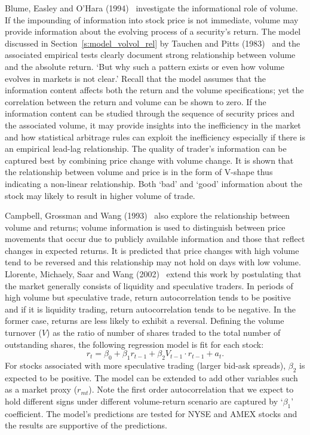 Blume, Easley and O'Hara (1994)~\cite{blumeohar} investigate the informational role of volume. If the impounding of information into stock price is not immediate, volume may provide information about the evolving process of a security's return. The model discussed in Section~\ref{s:model_volvol_rel} by Tauchen and Pitts (1983)~\cite{tauchenpitts} and the associated empirical tests clearly document strong relationship between volume and the absolute return. `But why such a pattern exists or even how volume evolves in markets is not clear.' Recall that the model assumes that the information content affects both the return and the volume specifications; yet the correlation between the return and volume can be shown to zero. If the information content can be studied through the sequence of security prices and the associated volume, it may provide insights into the inefficiency in the market and how statistical arbitrage rules can exploit the inefficiency especially if there is an empirical lead-lag relationship. The quality of trader's information can be captured best by combining price change with volume change. It is shown that the relationship between volume and price is in the form of V-shape thus indicating a non-linear relationship. Both `bad' and `good' information about the stock may likely to result in higher volume of trade. 


Campbell, Grossman and Wang (1993)~\cite{campbellgross} also explore the relationship between volume and returns; volume information is used to distinguish between price movements that occur due to publicly available information and those that reflect changes in expected returns. It is predicted that price changes with high volume tend to be reversed and this relationship may not hold on days with low volume. Llorente, Michaely, Saar and Wang (2002)~\cite{llmsw} extend this work by postulating that the market generally consists of liquidity and speculative traders. In periods of high volume but speculative trade, return autocorrelation tends to be positive and if it is liquidity trading, return autocorrelation tends to be negative. In the former case, returns are less likely to exhibit a reversal. Defining the volume turnover ($V$) as the ratio of number of shares traded to the total number of outstanding shares, the following regression model is fit for each stock:
	\begin{equation} \label{eqn:regxt}
	r_t= \beta_0 + \beta_1 r_{t-1} + \beta_2 V_{t-1} \cdot r_{t-1} + a_t.
	\end{equation}
For stocks associated with more speculative trading (larger bid-ask spreads), $\beta_2$ is expected to be positive. The model can be extended to add other variables such as a market proxy ($r_{mt}$). Note the first order autocorrelation that we expect to hold different signs under different volume-return scenario are captured by `$\beta_1$' coefficient. The model's predictions are tested for NYSE and AMEX stocks and the results are supportive of the predictions. 


